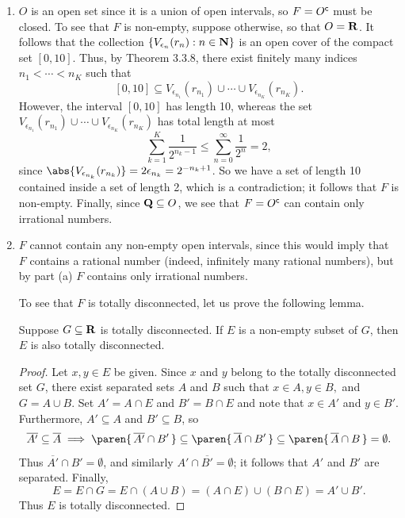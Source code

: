 \documentclass{lew98_solutions}
\begin{document}
\begin{solution}
    \begin{enumerate}
        \item \( O \) is an open set since it is a union of open intervals, so \( F = O^{\mathsf{c}} \) must be closed. To see that \( F \) is non-empty, suppose otherwise, so that \( O = \mathbf{R} \). It follows that the collection \( \{ V_{\epsilon_n}(r_n) : n \in \mathbf{N} \} \) is an open cover of the compact set \( [0, 10] \). Thus, by Theorem 3.3.8, there exist finitely many indices \( n_1 < \cdots < n_K \) such that
        \[
            [0, 10] \subseteq V_{\epsilon_{n_1}}(r_{n_1}) \cup \cdots \cup V_{\epsilon_{n_K}}(r_{n_K}).
        \]
        However, the interval \( [0, 10] \) has length 10, whereas the set \( V_{\epsilon_{n_1}}(r_{n_1}) \cup \cdots \cup V_{\epsilon_{n_K}}(r_{n_K}) \) has total length at most
        \[
            \sum_{k=1}^K \frac{1}{2^{n_k - 1}} \leq \sum_{n=0}^{\infty} \frac{1}{2^n} = 2,
        \]
        since \( \abs{V_{\epsilon_{n_k}}(r_{n_k})} = 2 \epsilon_{n_k} = 2^{-n_k + 1} \). So we have a set of length 10 contained inside a set of length 2, which is a contradiction; it follows that \( F \) is non-empty. Finally, since \( \mathbf{Q} \subseteq O \), we see that \( F = O^{\mathsf{c}} \) can contain only irrational numbers.

        \item \( F \) cannot contain any non-empty open intervals, since this would imply that \( F \) contains a rational number (indeed, infinitely many rational numbers), but by part (a) \( F \) contains only irrational numbers.

        To see that \( F \) is totally disconnected, let us prove the following lemma.

        \begin{lemma}
        \label{lem:ex3.4.9}
            Suppose \( G \subseteq \mathbf{R} \) is totally disconnected. If \( E \) is a non-empty subset of \( G \), then \( E \) is also totally disconnected.
        \end{lemma}
        \begin{proof}
            Let \( x, y \in E \) be given. Since \( x \) and \( y \) belong to the totally disconnected set \( G \), there exist separated sets \( A \) and \( B \) such that \( x \in A, y \in B, \) and \( G = A \cup B \). Set \( A' = A \cap E \) and \( B' = B \cap E \) and note that \( x \in A' \) and \( y \in B' \). Furthermore, \( A' \subseteq A \) and \( B' \subseteq B \), so
            \[
                \overline{A'} \subseteq \overline{A} \implies \paren{ \, \overline{A'} \cap B' \, } \subseteq \paren{ \, \overline{A} \cap B' \, } \subseteq \paren{ \, \overline{A} \cap B \, } = \emptyset.
            \]
            Thus \( \overline{A'} \cap B' = \emptyset \), and similarly \( A' \cap \overline{B'} = \emptyset \); it follows that \( A' \) and \( B' \) are separated. Finally,
            \[
                E = E \cap G = E \cap (A \cup B) = (A \cap E) \cup (B \cap E) = A' \cup B'.
            \]
            Thus \( E \) is totally disconnected.
        \end{proof}
        

\end{enumerate}
\end{solution}
\end{document}
